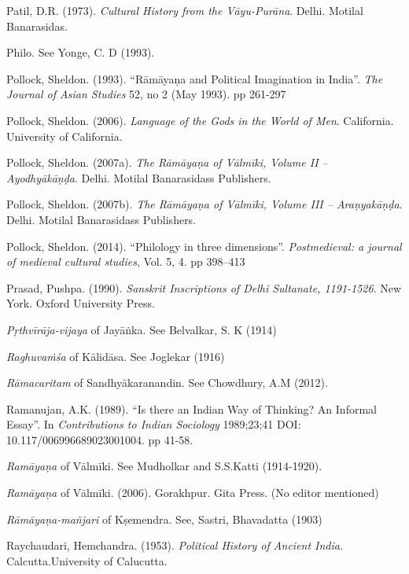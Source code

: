 \begin{thebibliography}{99}
Patil, D.R. (1973). {\sl Cultural History from the Vāyu-Purāna}. Delhi. Motilal Banarasidas. 

Philo. See Yonge, C. D (1993).

Pollock, Sheldon. (1993). “Rāmāyaṇa and Political Imagination in India”. {\sl The Journal of Asian Studies} 52, no 2 (May 1993). pp 261-297

Pollock, Sheldon. (2006). {\sl Language of the Gods in the World of Men}. California. University of California. 

Pollock, Sheldon. (2007a). {\sl The Rāmāyaṇa of Vālmīki, Volume II – Ayodhyākāṇḍa}. Delhi.  Motilal Banarasidass Publishers. 

Pollock, Sheldon. (2007b). {\sl The Rāmāyaṇa of Vālmīki, Volume III – Araṇyakāṇḍa}. Delhi. Motilal Banarasidass Publishers. 

Pollock, Sheldon. (2014). “Philology in three dimensions”. {\sl Postmedieval: a journal of medieval cultural studies}, Vol. 5, 4. pp 398–413

Prasad, Pushpa. (1990). {\sl Sanskrit Inscriptions of Delhi Sultanate, 1191-1526}. New York. Oxford University Press. 

{\sl Pṛthvīrāja-vijaya} of Jayāṅka. See Belvalkar, S. K (1914) 

{\sl Raghuvaṁśa} of Kālidāsa. See Joglekar (1916)

{\sl Rāmacaritam} of Sandhyākaranandin. See Chowdhury, A.M (2012). 

Ramanujan, A.K. (1989). “Is there an Indian Way of Thinking? An Informal Essay”. In {\sl Contributions to Indian Sociology} 1989;23;41 DOI: 10.117/006996689023001004. pp 41-58.

{\sl Ramāyaṇa} of Vālmīki. See Mudholkar and S.S.Katti (1914-1920).

{\sl Ramāyaṇa} of Vālmīki. (2006). Gorakhpur. Gita Press. (No editor mentioned)

{\sl Rāmāyaṇa-mañjari} of Kṣemendra. See, Sastri, Bhavadatta  (1903)

Raychaudari, Hemchandra. (1953). {\sl Political History of Ancient India}. Calcutta.University of Calucutta.


\end{thebibliography}
